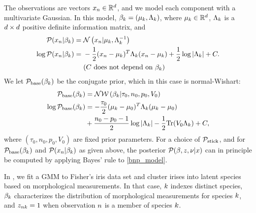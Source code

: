 \begin{ex}
%
The observations are vectors $x_n \in \mathbb{R}^d$, and we model each
component with a multivariate Gaussian. In this model, $\beta_k = (\mu_k,
\Lambda_k)$, where $\mu_k \in \mathbb{R}^d$, $\Lambda_k$ is a $d\times d$
positive definite information matrix, and
%
\begin{align*}
%
\p(\x_\n \vert \beta_\k) ={}& \normdist{\x_n \vert \mu_\k, \Lambda_\k^{-1}} \\
\logp(\x_\n \vert \beta_\k) ={}&
    -\frac{1}{2}(\x_n - \mu_k)^T \Lambda_\k (\x_n - \mu_k)
    + \frac{1}{2} \log |\Lambda_\k| + \const.\\
    & \constdesc{\beta_\k}
%
\end{align*}
We let $\mathcal{P}_{\mathrm{base}}(\beta_k)$ be the conjugate prior, which in this case is normal-Wishart:
\begin{align*}
  \mathcal{P}_{\mathrm{base}}(\beta_k) &= \mathcal{N}\mathcal{W}\left(\beta_k \vert \tau_0, n_0, p_0, V_0\right)\\
  \log\mathcal{P}_{\mathrm{base}}(\beta_k) &=
      -\frac{\tau_0}{2}(\mu_k - \mu_0)^T \Lambda_k (\mu_k - \mu_0)\\
      &{} + \frac{n_0 - p_0 - 1}{2} \log |\Lambda_k| -
      \frac{1}{2} \textrm{Tr}(V_0 \Lambda_k) + C,
\end{align*}
where $(\tau_0, n_0, p_0, V_0)$ are fixed prior parameters.
%
For a choice of $\mathcal{P}_{\mathrm{stick}}$, and for $\mathcal{P}_{\mathrm{base}}(\beta_k)$ and $\mathcal{P}(x_n \vert
\beta_k)$ as given above, the posterior $\mathcal{P}(\beta, z, \nu \vert x)$ can in
principle be computed by applying Bayes' rule to \eqref{bnp_model}.

In , we fit a GMM to Fisher's iris data set and cluster irises
into latent species based on morphological measurements.  In that case, $k$
indexes distinct species, $\beta_{k}$ characterizes the distribution of
morphological measurements for species $k$, and $z_{nk} = 1$ when
observation $n$ is a member of species $k$.
%
\end{ex}






